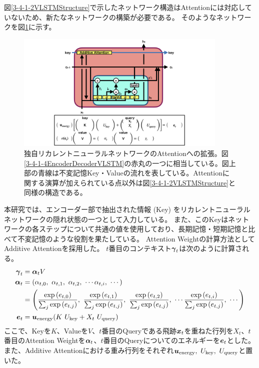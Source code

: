 図\ref{3-4-1-2VLSTMStructure}で示したネットワーク構造はAttentionには対応していないため、新たなネットワークの構築が必要である。
そのようなネットワークを図\ref{3-4-1-5AttentionVLSTM}に示す。

\begin{figure}[htbp]
 \centering
 \includegraphics[trim = 100 0 100 0, width=0.9\textwidth, clip]{Figure/3Networks/3-4-1-5AttentionVLSTM.png}
 \caption[独自リカレントニューラルネットワークのAttentionへの拡張]{独自リカレントニューラルネットワークのAttentionへの拡張。図\ref{3-4-1-4EncoderDecoderVLSTM}の赤丸の一つに相当している。図上部の青線は不変記憶Key・Valueの流れを表している。Attentionに関する演算が加えられている点以外は図\ref{3-4-1-2VLSTMStructure}と同様の構造である。}
 \label{3-4-1-5AttentionVLSTM}
\end{figure}

本研究では、エンコーダー部で抽出された情報 (Key) をリカレントニューラルネットワークの隠れ状態の一つとして入力している。
また、このKeyはネットワークの各ステップについて共通の値を使用しており、長期記憶・短期記憶と比べて不変記憶のような役割を果たしている。
Attention Weightの計算方法としてAdditive Attentionを採用した。
$t$番目のコンテキスト${\mbox{\boldmath{$\gamma$}}}_{t}$は次のように計算される。
\begin{equation}
 \begin{split}
  {\mbox{\boldmath{$\gamma$}}}_{t} 
  &= {\mbox{\boldmath{$\alpha$}}}_{t} V\\
  {\mbox{\boldmath{$\alpha$}}}_{t}
  &= (\alpha_{t,0},\ \alpha_{t,1},\ \alpha_{t,2},\ \cdots \alpha_{t,i},\ \cdots) \\
  &= \left(\frac{\exp{({{e}}_{t,0})}}{\sum_j \exp{({{e}}_{t,j})}},\ \frac{\exp{({{e}}_{t,1})}}{\sum_j \exp{({{e}}_{t,j})}},\ \frac{\exp{({{e}}_{t,2})}}{\sum_j \exp{({{e}}_{t,j})}},\  \cdots \frac{\exp{({{e}}_{t,i})}}{\sum_j \exp{({{e}}_{t,j})}},\ \cdots\right)\\
  {\mbox{\boldmath{$e$}}}_{t}
  &={\mbox{\boldmath{$u$}}}_{\rm energy} (K\ U_{\rm key} + X_t\ U_{\rm query}) \\
 \end{split}
\end{equation}
ここで、Keyを$K$、Valueを$V$、$t$番目のQueryである飛跡${\mbox{\boldmath{$x$}}}_{t}$を重ねた行列を$X_t$、$t$番目のAttention Weightを${\mbox{\boldmath{$\alpha$}}}_{t}$、$t$番目のQueryについてのエネルギーを${\mbox{\boldmath{$e$}}}_{t}$とした。
また、Additive Attentionにおける重み行列をそれぞれ${\mbox{\boldmath{$u$}}}_{\rm energy},\  U_{\rm key},\ U_{\rm query}$と置いた。

